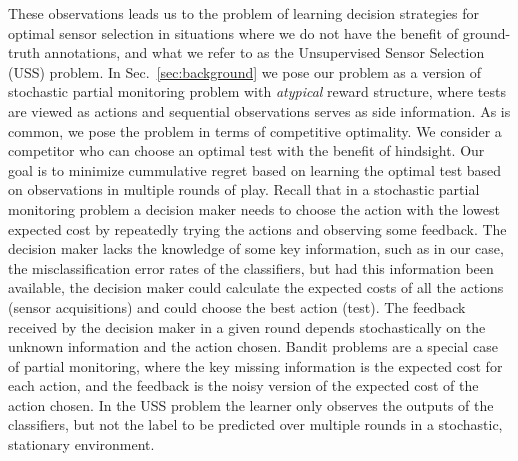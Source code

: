 These observations leads us to the problem of learning decision strategies for optimal sensor selection in situations where we do not have the benefit of ground-truth annotations, and what we refer to as the Unsupervised Sensor Selection (USS) problem. %
In Sec.~\ref{sec:background} we pose our problem as a version of stochastic partial monitoring problem \cite{BaFoPaRaSze14} with \emph{atypical} reward structure, where tests are viewed as actions and sequential observations serves as side information. As is common, we pose the problem in terms of competitive optimality. We consider a competitor who can choose an optimal test with the benefit of hindsight. Our goal is to minimize cummulative regret based on learning the optimal test based on observations in multiple rounds of play. %
Recall that in a stochastic partial monitoring problem a decision maker needs to choose the action with the lowest expected cost by repeatedly trying the actions and observing some feedback.
The decision maker lacks the knowledge of some key information, such as in our case, the misclassification
error rates of the classifiers, but had this information been available, the decision maker could calculate the
expected costs of all the actions (sensor acquisitions) and could choose the best action (test). The feedback received by the decision maker in a given round depends stochastically on the unknown information and the action chosen.
Bandit problems \cite{Tho33} are a special case of partial monitoring, where the key missing information is the expected
cost for each action, and the feedback is the noisy version of the expected cost of the action chosen.
In the USS problem the learner only observes the outputs of the classifiers, but not the label to be predicted over multiple rounds
in a stochastic, stationary environment. 


